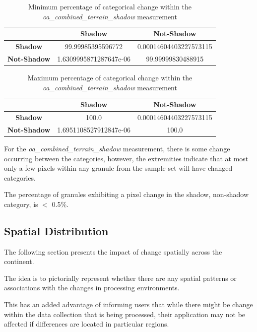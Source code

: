 \documentclass[a4paper]{article}
\begin{document}
    \begin{table}[ht!]
      \caption{Minimum percentage of categorical change within the \textit{oa\_combined\_terrain\_shadow} measurement}\label{table:11}
      \centering
      \begin{tabular}{ccc} \midrule
        & \textbf{Shadow} & \textbf{Not-Shadow} \\ \midrule
        \textbf{Shadow} & 99.99985395596772 & 0.00014604403227573115 \\
        \textbf{Not-Shadow} & 1.6309995871287647e-06 & 99.99999830488915 \\
      \end{tabular}
    \end{table}

    \begin{table}[ht!]
      \caption{Maximum percentage of categorical change within the \textit{oa\_combined\_terrain\_shadow} measurement}\label{table:12}
      \centering
      \begin{tabular}{ccc} \midrule
        & \textbf{Shadow} & \textbf{Not-Shadow} \\ \midrule
        \textbf{Shadow} & 100.0 & 0.00014604403227573115 \\
        \textbf{Not-Shadow} & 1.6951108527912847e-06 & 100.0 \\
      \end{tabular}
    \end{table}

    \begin{flushleft}
      For the \textit{oa\_combined\_terrain\_shadow} measurement, there is some change occurring between the categories, however, the extremities indicate that at most only a few pixels within any granule from the sample set will have changed categories. \par
      The percentage of granules exhibiting a pixel change in the shadow, non-shadow category, is $<$ 0.5\%.
    \end{flushleft}

    \subsection{Spatial Distribution}

      \begin{flushleft}
        The following section presents the impact of change spatially across the continent. \par
        The idea is to pictorially represent whether there are any spatial patterns or associations with the changes in processing environments. \par
        This has an added advantage of informing users that while there might be change within the data collection that is being processed, their application may not be affected if differences are located in particular regions.
      \end{flushleft}
\end{document}
